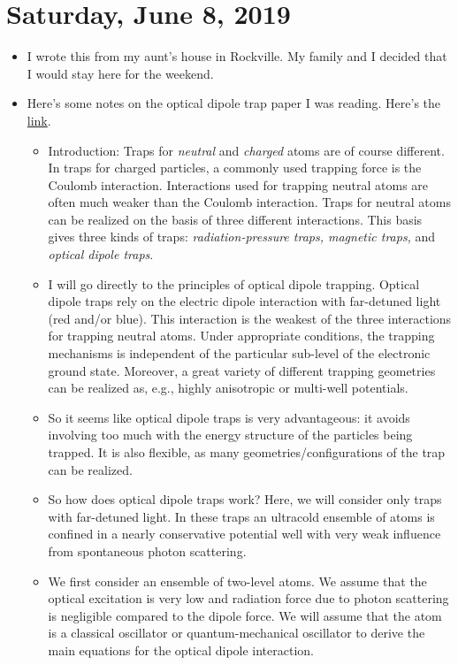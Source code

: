 \documentclass{book}
\theoremstyle{definition}
\begin{document}
\section*{Saturday, June 8, 2019}
\begin{itemize}
	\item I wrote this from my aunt's house in Rockville. My family and I decided that I would stay here for the weekend.
	
	\item Here's some notes on the optical dipole trap paper I was reading. Here's the \href{https://arxiv.org/pdf/physics/9902072.pdf}{link}.
	
	\begin{itemize}
		\item Introduction: Traps for \textit{neutral} and \textit{charged} atoms are of course different. In traps for charged particles, a commonly used trapping force is the Coulomb interaction. Interactions used for trapping neutral atoms are often much weaker than the Coulomb interaction. Traps for neutral atoms can be realized on the basis of three different interactions. This basis gives three kinds of traps: \textit{radiation-pressure traps, magnetic traps,} and \textit{optical dipole traps}.
		
		\item I will go directly to the principles of optical dipole trapping. Optical dipole traps rely on the electric dipole interaction with far-detuned light (red and/or blue). This interaction is the weakest of the three interactions for trapping neutral atoms. Under appropriate conditions, the trapping mechanisms is independent of the particular sub-level of the electronic ground state. Moreover, a great variety of different trapping geometries can be realized as, e.g., highly anisotropic or multi-well potentials.

		
		\item So it seems like optical dipole traps is very advantageous: it avoids involving too much with the energy structure of the particles being trapped. It is also flexible, as many geometries/configurations of the trap can be realized.
		
		\item So how does optical dipole traps work? Here, we will consider only traps with far-detuned light.  In these traps an ultracold ensemble
		of atoms is confined in a nearly conservative potential well with very weak influence from spontaneous photon scattering. 
		
		
		\item We first consider an ensemble of two-level atoms. We assume that the optical excitation is very low and radiation force due to photon scattering is negligible compared to the dipole force. We will assume that the atom is a classical oscillator or quantum-mechanical oscillator to derive the main equations for the optical dipole interaction. 
		

\end{itemize}
\end{itemize}
\end{document}
